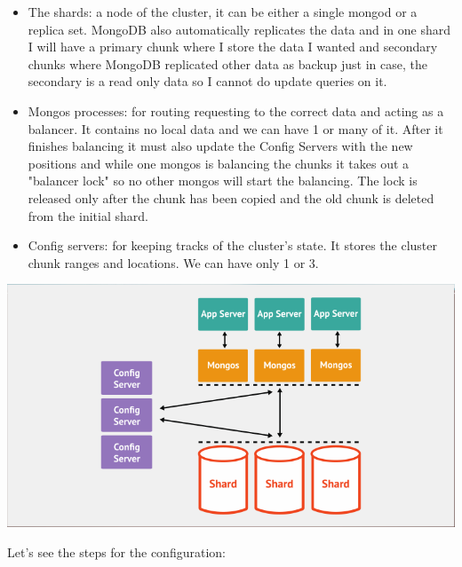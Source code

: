 \documentclass[a4page, 11pt]{article}
\begin{document}
\begin{itemize}[noitemsep]
	\item The shards: a node of the cluster, it can be either a single mongod or a replica set. 
	MongoDB also automatically replicates the data and in one shard I will have a primary chunk where I store the data I wanted and secondary chunks where MongoDB replicated other data as backup just in case, the secondary is a read only data so I cannot do update queries on it.
	\item Mongos processes: for routing requesting to the correct data and acting as a balancer. It contains no local data and we can have 1 or many of it. After it finishes balancing it must also update the Config Servers with the new positions and while one mongos is balancing the chunks it takes out a "balancer lock" so no other mongos will start the balancing. The lock is released only after the chunk has been copied and the old chunk is deleted from the initial shard.
	\item Config servers: for keeping tracks of the cluster's state. It stores the cluster chunk ranges and locations.
	We can have only 1 or 3.
\end{itemize}

\begin{center}
	\includegraphics[scale=0.50]{IMAGE6.png}
\end{center}


Let's see the steps for the configuration:
\end{document}
